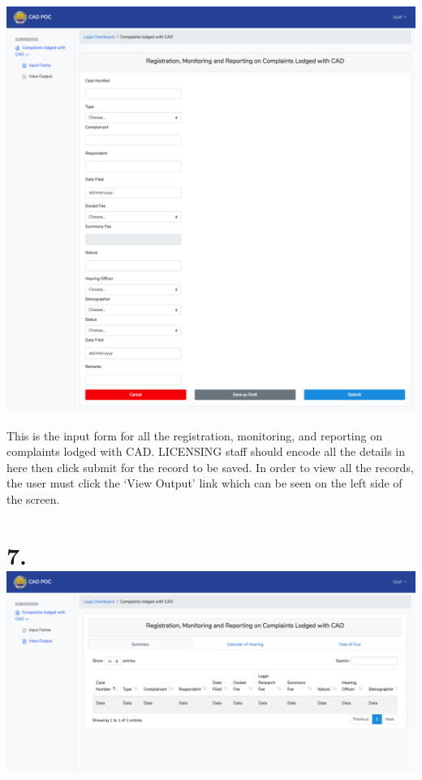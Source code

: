 \documentclass{article}
\begin{document}
\includegraphics[keepaspectratio=true]{up-ic-screens/image176}{}%

This is the input form for all the registration,
monitoring, and reporting on complaints lodged with CAD. LICENSING staff
should encode all the details in here then click submit for the record
to be saved. In order to view all the records, the user must click the
‘View Output’ link which can be seen on the left side of the
screen.%

\section{7.\hspace*{0.5em}\includegraphics[keepaspectratio=true]{up-ic-screens/image140}{}}\label{sec-up-ic-screensimage140png}%
\end{document}
